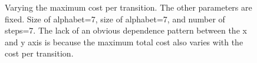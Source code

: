 \begin{figure}[H]

  \caption{Varying the maximum cost per transition. The other parameters are fixed. Size of alphabet=7, size of alphabet=7, and number of steps=7. The lack of an obvious dependence pattern between the x and y axis is because the maximum total cost also varies with the cost per transition.}\label{fig:cost}
\end{figure}
